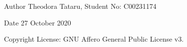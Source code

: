 \begin{DoxyAuthor}{Author}
Theodora Tataru, Student No\+: C00231174 
\end{DoxyAuthor}
\begin{DoxyDate}{Date}
27 October 2020 
\end{DoxyDate}
\begin{DoxyCopyright}{Copyright}
License\+: G\+NU Affero General Public License v3. 
\end{DoxyCopyright}
